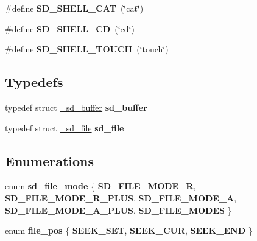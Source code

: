 \begin{DoxyCompactItemize}
\item 
\hypertarget{group__SD__Card_gadedf3ed15c6eae02a70d5d68ff99cece}{\#define {\bfseries \-S\-D\-\_\-\-S\-H\-E\-L\-L\-\_\-\-C\-A\-T}~(\char`\"{}cat\char`\"{})}\label{group__SD__Card_gadedf3ed15c6eae02a70d5d68ff99cece}

\item 
\hypertarget{group__SD__Card_ga6608a5ac2b0438ca1c0be83ee6673032}{\#define {\bfseries \-S\-D\-\_\-\-S\-H\-E\-L\-L\-\_\-\-C\-D}~(\char`\"{}cd\char`\"{})}\label{group__SD__Card_ga6608a5ac2b0438ca1c0be83ee6673032}

\item 
\hypertarget{group__SD__Card_gab9d5b49884f9f55508a7d581039a0026}{\#define {\bfseries \-S\-D\-\_\-\-S\-H\-E\-L\-L\-\_\-\-T\-O\-U\-C\-H}~(\char`\"{}touch\char`\"{})}\label{group__SD__Card_gab9d5b49884f9f55508a7d581039a0026}

\end{DoxyCompactItemize}
\subsection*{\-Typedefs}
\begin{DoxyCompactItemize}
\item 
\hypertarget{group__SD__Card_ga1c76037c62c46cef034ba7ba569120f1}{typedef struct \hyperlink{struct__sd__buffer}{\-\_\-sd\-\_\-buffer} {\bfseries sd\-\_\-buffer}}\label{group__SD__Card_ga1c76037c62c46cef034ba7ba569120f1}

\item 
\hypertarget{group__SD__Card_ga7c6b819d64f1bcac5c28ea3cf039abce}{typedef struct \hyperlink{struct__sd__file}{\-\_\-sd\-\_\-file} {\bfseries sd\-\_\-file}}\label{group__SD__Card_ga7c6b819d64f1bcac5c28ea3cf039abce}

\end{DoxyCompactItemize}
\subsection*{\-Enumerations}
\begin{DoxyCompactItemize}
\item 
enum {\bfseries sd\-\_\-file\-\_\-mode} \{ \*
{\bfseries \-S\-D\-\_\-\-F\-I\-L\-E\-\_\-\-M\-O\-D\-E\-\_\-\-R}, 
{\bfseries \-S\-D\-\_\-\-F\-I\-L\-E\-\_\-\-M\-O\-D\-E\-\_\-\-R\-\_\-\-P\-L\-U\-S}, 
{\bfseries \-S\-D\-\_\-\-F\-I\-L\-E\-\_\-\-M\-O\-D\-E\-\_\-\-A}, 
{\bfseries \-S\-D\-\_\-\-F\-I\-L\-E\-\_\-\-M\-O\-D\-E\-\_\-\-A\-\_\-\-P\-L\-U\-S}, 
\*
{\bfseries \-S\-D\-\_\-\-F\-I\-L\-E\-\_\-\-M\-O\-D\-E\-S}
 \}
\item 
enum {\bfseries file\-\_\-pos} \{ {\bfseries \-S\-E\-E\-K\-\_\-\-S\-E\-T}, 
{\bfseries \-S\-E\-E\-K\-\_\-\-C\-U\-R}, 
{\bfseries \-S\-E\-E\-K\-\_\-\-E\-N\-D}
 \}
\end{DoxyCompactItemize}
